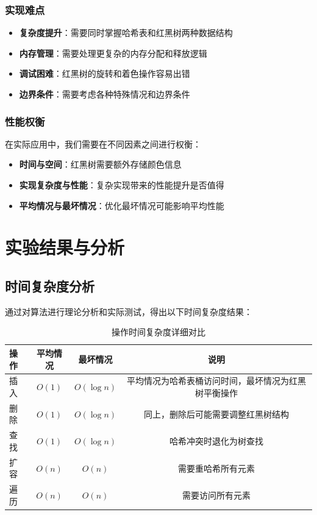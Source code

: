 \documentclass[12pt,a4paper]{article}
\begin{document}
\subsubsection{实现难点}
\begin{itemize}
\item \textbf{复杂度提升}：需要同时掌握哈希表和红黑树两种数据结构
\item \textbf{内存管理}：需要处理更复杂的内存分配和释放逻辑
\item \textbf{调试困难}：红黑树的旋转和着色操作容易出错
\item \textbf{边界条件}：需要考虑各种特殊情况和边界条件
\end{itemize}

\subsubsection{性能权衡}
在实际应用中，我们需要在不同因素之间进行权衡：
\begin{itemize}
\item \textbf{时间与空间}：红黑树需要额外存储颜色信息
\item \textbf{实现复杂度与性能}：复杂实现带来的性能提升是否值得
\item \textbf{平均情况与最坏情况}：优化最坏情况可能影响平均性能
\end{itemize}

\section{实验结果与分析}

\subsection{时间复杂度分析}
通过对算法进行理论分析和实际测试，得出以下时间复杂度结果：

\begin{table}[h]
\centering
\caption{操作时间复杂度详细对比}
\begin{tabular}{|l|c|c|c|}
\hline
操作 & 平均情况 & 最坏情况 & 说明 \\
\hline
插入 & $O(1)$ & $O(\log n)$ & 平均情况为哈希表桶访问时间，最坏情况为红黑树平衡操作\\
删除 & $O(1)$ & $O(\log n)$ & 同上，删除后可能需要调整红黑树结构\\
查找 & $O(1)$ & $O(\log n)$ & 哈希冲突时退化为树查找\\
扩容 & $O(n)$ & $O(n)$ & 需要重哈希所有元素\\
遍历 & $O(n)$ & $O(n)$ & 需要访问所有元素\\
\hline
\end{tabular}
\end{table}
\end{document}
